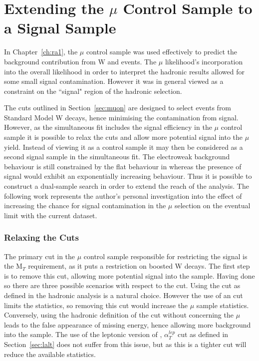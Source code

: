 \chapter{Extending the $\mu$ Control Sample to a Signal Sample}
\label{ch:ra4}

In Chapter~\ref{ch:ra1}, the $\mu$ control sample was used effectively to predict the background contribution from W and \tto events. The $\mu$ likelihood's incorporation into the overall likelihood in order to interpret the hadronic results allowed for some small signal contamination. However it was in general viewed as a constraint on the ``signal" region of the hadronic selection. 

The cuts outlined in Section~\ref{sec:muon} are designed to select events from Standard Model W decays, hence minimising the contamination from signal. However, as the simultaneous fit includes the signal efficiency in the $\mu$ control sample it is possible to relax the cuts and allow more potential signal into the $\mu$ yield. Instead of viewing it as a control sample it may then be considered as a second signal sample in the simultaneous fit. The electroweak background behaviour is still constrained by the flat behaviour in \RaT whereas the presence of signal would exhibit an exponentially increasing behaviour. Thus it is possible to construct a dual-sample search in order to extend the reach of the analysis.  The following work represents the author's personal investigation into the effect of increasing the chance for signal contamination in the $\mu$ selection on the eventual limit with the current dataset. 

\subsection{Relaxing the Cuts}

The primary cut in the $\mu$ control sample responsible for restricting the signal is the M$_{T}$ requirement, as it puts a restriction on boosted W decays. The first step is to remove this cut, allowing more potential signal into the sample. Having done so there are three possible scenarios with respect to the \alt cut. Using the \alt cut as defined in the hadronic analysis is a natural choice. However the use of an \alt cut limits the statistics, so removing this cut would increase the $\mu$ sample statistics. Conversely, using the hadronic definition of the \alt cut without concerning the $\mu$ leads to the false appearance of missing energy, hence allowing more background into the sample. The use of the leptonic version of \alt, $\alpha^{lep}_{T}$ cut as defined in Section~\ref{sec:lalt} does not suffer from this issue, but as this is a tighter cut will reduce the available statistics. 


